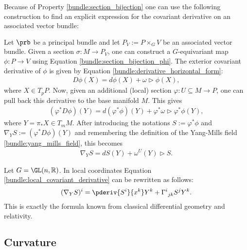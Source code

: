     Because of Property \ref{bundle:section_bijection} one can use the following construction to find an explicit expression for the covariant derivative on an associated vector bundle:
    \begin{construct}\label{bundle:covariant_derivative_associated_bundle}
        Let $\prb$ be a principal bundle and let $P_V := P\times_G V$ be an associated vector bundle. Given a section $\sigma:M\rightarrow P_V$, one can construct a $G$-equivariant map $\phi:P\rightarrow V$ using Equation \eqref{bundle:section_bijection_phi}. The exterior covariant derivative of $\phi$ is given by Equation \eqref{bundle:derivative_horizontal_form}:
        \begin{gather}
            D\phi(X) = d\phi(X) + \omega\triangleright\phi(X),
        \end{gather}
        where $X\in T_pP$. Now, given an additional (local) section $\varphi:U\subseteq M\rightarrow P$, one can pull back this derivative to the base manifold $M$. This gives
        \begin{gather}
            (\varphi^*D\phi)(Y) = d(\varphi^*\phi)(Y) + \varphi^*\omega\triangleright\varphi^*\phi(Y),
        \end{gather}
        where $Y=\pi_*X\in T_mM$. After introducing the notations $S:=\varphi^*\phi$ and $\nabla_YS:=(\varphi^*D\phi)(Y)$ and remembering the definition of the Yang-Mills field \ref{bundle:yang_mills_field}, this becomes
        \begin{gather}
            \label{bundle:local_covariant_derivative}
            \nabla_YS = dS(Y) + \omega^U(Y)\triangleright S.
        \end{gather}
    \end{construct}
    \begin{example}
        Let $G=\GL(n,\mathbb{R})$. In local coordinates Equation \eqref{bundle:local_covariant_derivative} can be rewritten as follows:
        \begin{gather}
            (\nabla_YS)^i = \pderiv{S^i}{x^k}Y^k + \Gamma^i_{\ jk}S^jY^k.
        \end{gather}
        This is exactly the formula known from classical differential geometry and relativity.
    \end{example}

\subsection{Curvature}

